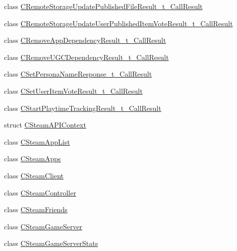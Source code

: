 \begin{DoxyCompactItemize}
\item 
class \hyperlink{class_valve_1_1_steamworks_1_1_c_remote_storage_update_published_file_result__t___call_result}{C\+Remote\+Storage\+Update\+Published\+File\+Result\+\_\+t\+\_\+\+Call\+Result}
\item 
class \hyperlink{class_valve_1_1_steamworks_1_1_c_remote_storage_update_user_published_item_vote_result__t___call_result}{C\+Remote\+Storage\+Update\+User\+Published\+Item\+Vote\+Result\+\_\+t\+\_\+\+Call\+Result}
\item 
class \hyperlink{class_valve_1_1_steamworks_1_1_c_remove_app_dependency_result__t___call_result}{C\+Remove\+App\+Dependency\+Result\+\_\+t\+\_\+\+Call\+Result}
\item 
class \hyperlink{class_valve_1_1_steamworks_1_1_c_remove_u_g_c_dependency_result__t___call_result}{C\+Remove\+U\+G\+C\+Dependency\+Result\+\_\+t\+\_\+\+Call\+Result}
\item 
class \hyperlink{class_valve_1_1_steamworks_1_1_c_set_persona_name_response__t___call_result}{C\+Set\+Persona\+Name\+Response\+\_\+t\+\_\+\+Call\+Result}
\item 
class \hyperlink{class_valve_1_1_steamworks_1_1_c_set_user_item_vote_result__t___call_result}{C\+Set\+User\+Item\+Vote\+Result\+\_\+t\+\_\+\+Call\+Result}
\item 
class \hyperlink{class_valve_1_1_steamworks_1_1_c_start_playtime_tracking_result__t___call_result}{C\+Start\+Playtime\+Tracking\+Result\+\_\+t\+\_\+\+Call\+Result}
\item 
struct \hyperlink{struct_valve_1_1_steamworks_1_1_c_steam_a_p_i_context}{C\+Steam\+A\+P\+I\+Context}
\item 
class \hyperlink{class_valve_1_1_steamworks_1_1_c_steam_app_list}{C\+Steam\+App\+List}
\item 
class \hyperlink{class_valve_1_1_steamworks_1_1_c_steam_apps}{C\+Steam\+Apps}
\item 
class \hyperlink{class_valve_1_1_steamworks_1_1_c_steam_client}{C\+Steam\+Client}
\item 
class \hyperlink{class_valve_1_1_steamworks_1_1_c_steam_controller}{C\+Steam\+Controller}
\item 
class \hyperlink{class_valve_1_1_steamworks_1_1_c_steam_friends}{C\+Steam\+Friends}
\item 
class \hyperlink{class_valve_1_1_steamworks_1_1_c_steam_game_server}{C\+Steam\+Game\+Server}
\item 
class \hyperlink{class_valve_1_1_steamworks_1_1_c_steam_game_server_stats}{C\+Steam\+Game\+Server\+Stats}

\end{DoxyCompactItemize}
